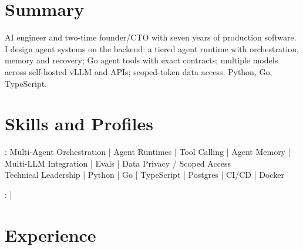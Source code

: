 \documentclass[print]{jack-resume}
\begin{document}
\pagecolor{darkmodeBackground}


\begin{minipage}[t][1cm][t]{.03\textwidth}
    \hfill
\end{minipage}

\section{Summary}
AI engineer and two-time founder/CTO with seven years of production software. I design agent systems on the backend: a tiered agent runtime with orchestration, memory and recovery; Go agent tools with exact contracts; multiple models across self-hosted vLLM and APIs; scoped-token data access. Python, Go, TypeScript.
\sectionsep

\section{Skills and Profiles}
:
Multi-Agent Orchestration \hfill | \hfill
Agent Runtimes \hfill | \hfill
Tool Calling \hfill | \hfill
Agent Memory \hfill | \hfill
Multi-LLM Integration \hfill | \hfill
Evals \hfill | \hfill
Data Privacy / Scoped Access \\
\hspace{1.0cm} Technical Leadership \hfill | \hfill
Python \hfill | \hfill
Go \hfill | \hfill
TypeScript \hfill | \hfill
Postgres \hfill | \hfill
CI/CD \hfill | \hfill
Docker \\

\raggedright{
    :
      \href{https://www.linkedin.com/in/jack-sturtevant/}{ \ExternalLink} |
     \href{https://github.com/jacksturt}{ \ExternalLink}}

\section{Experience}
\end{document}
